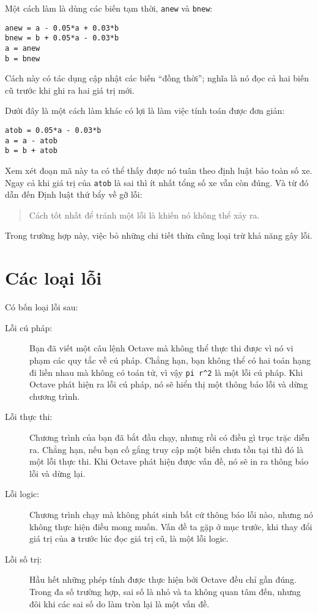 \documentclass[12pt]{book}
\begin{document}
Một cách làm là dùng các biến tạm thời, {\tt anew} và {\tt bnew}:

\begin{verbatim}
anew = a - 0.05*a + 0.03*b
bnew = b + 0.05*a - 0.03*b
a = anew
b = bnew
\end{verbatim}
%
Cách này có tác dụng cập nhật các biến ``đồng thời''; nghĩa là
nó đọc cả hai biến cũ trước khi ghi ra hai giá trị mới.

Dưới đây là một cách làm khác có lợi là làm việc tính toán được
đơn giản:

\begin{verbatim}
atob = 0.05*a - 0.03*b
a = a - atob
b = b + atob
\end{verbatim}
%
Xem xét đoạn mã này ta có thể thấy được nó tuân theo định luật
bảo toàn số xe. Ngay cả khi giá trị của {\tt atob} là sai thì ít nhất 
tổng số xe vẫn còn đúng. Và từ đó dẫn đến Định luật thứ bẩy về
gỡ lỗi:

\begin{quote}
Cách tốt nhất để tránh một lỗi là khiến nó không thể xảy ra.
\end{quote}

Trong trường hợp này, việc bỏ những chi tiết thừa cũng loại trừ 
khả năng gây lỗi.


\section{Các loại lỗi}

Có bốn loại lỗi sau:

\begin{description}

\item[Lỗi cú pháp:] Bạn đã viết một câu lệnh Octave mà không thể
thực thi được vì nó vi phạm các quy tắc về cú pháp. Chẳng hạn, bạn
không thể có hai toán hạng đi liền nhau mà không có toán tử, vì vậy
\verb+pi r^2+ là một lỗi cú pháp. Khi Octave phát hiện ra lỗi cú pháp,
nó sẽ hiển thị một thông báo lỗi và dừng chương trình.

\item[Lỗi thực thi:] Chương trình của bạn đã bắt đầu chạy, nhưng rồi
có điều gì trục trặc diễn ra. Chẳng hạn, nếu bạn cố gắng truy cập
một biến chưa tồn tại thì đó là một lỗi thực thi. Khi Octave phát hiện
được vấn đề, nó sẽ in ra thông báo lỗi và dừng lại.

\item[Lỗi logic:] Chương trình chạy mà không phát sinh bất cứ thông báo
lỗi nào, nhưng nó không thực hiện điều mong muốn. Vấn đề ta gặp ở
mục trước, khi thay đổi giá trị của {\tt a} trước lúc đọc giá trị cũ, là
một lỗi logic.

\item[Lỗi số trị:] Hầu hết những phép tính được thực hiện bởi Octave 
đều chỉ gần đúng. Trong đa số trường hợp, sai số là nhỏ và ta không
quan tâm đến, nhưng đôi khi các sai số do làm tròn lại là một vấn đề.

\end{description}
\end{document}

